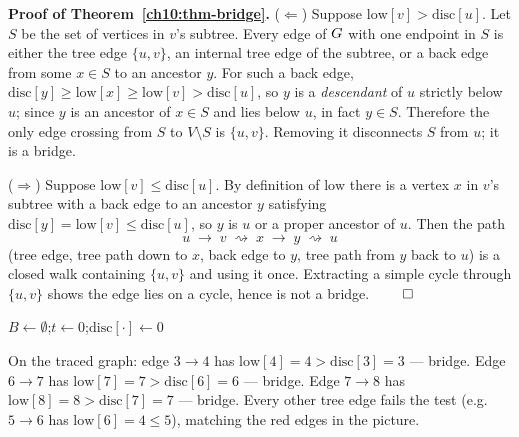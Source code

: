 \begin{formalbox}
\textbf{Proof of Theorem~\ref{ch10:thm-bridge}.}
($\Leftarrow$) Suppose $\mathrm{low}[v]>\mathrm{disc}[u]$. Let $S$ be the set of
vertices in $v$'s subtree. Every edge of $G$ with one endpoint in $S$ is either the
tree edge $\{u,v\}$, an internal tree edge of the subtree, or a back edge from some
$x\in S$ to an ancestor $y$. For such a back edge, $\mathrm{disc}[y]\ge\mathrm{low}[x]
\ge\mathrm{low}[v]>\mathrm{disc}[u]$, so $y$ is a \emph{descendant} of $u$ strictly below
$u$; since $y$ is an ancestor of $x\in S$ and lies below $u$, in fact $y\in S$.
Therefore the only edge crossing from $S$ to $V\setminus S$ is $\{u,v\}$. Removing it
disconnects $S$ from $u$; it is a bridge.

($\Rightarrow$) Suppose $\mathrm{low}[v]\le\mathrm{disc}[u]$. By definition of
$\mathrm{low}$ there is a vertex $x$ in $v$'s subtree with a back edge to an ancestor
$y$ satisfying $\mathrm{disc}[y]=\mathrm{low}[v]\le\mathrm{disc}[u]$, so $y$ is $u$ or a
proper ancestor of $u$. Then the path
\[
  u \;\to\; v \;\rightsquigarrow\; x \;\to\; y \;\rightsquigarrow\; u
\]
(tree edge, tree path down to $x$, back edge to $y$, tree path from $y$ back to $u$)
is a closed walk containing $\{u,v\}$ and using it once. Extracting a simple cycle
through $\{u,v\}$ shows the edge lies on a cycle, hence is not a bridge. $\qed$
\end{formalbox}

\begin{algorithm}[H]
\caption{\textsc{Bridges}: list all bridges in one DFS}
\label{ch10:alg-bridges}
$B\gets\emptyset$;\quad $t\gets0$;\quad $\mathrm{disc}[\cdot]\gets0$\;
\end{algorithm}

On the traced graph: edge $3\!\to\!4$ has $\mathrm{low}[4]=4>\mathrm{disc}[3]=3$
--- bridge. Edge $6\!\to\!7$ has $\mathrm{low}[7]=7>\mathrm{disc}[6]=6$ --- bridge.
Edge $7\!\to\!8$ has $\mathrm{low}[8]=8>\mathrm{disc}[7]=7$ --- bridge. Every other
tree edge fails the test (e.g.\ $5\!\to\!6$ has $\mathrm{low}[6]=4\le5$), matching the
red edges in the picture.

